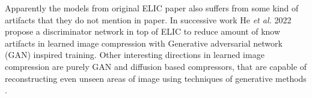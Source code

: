 \documentclass{article}
\begin{document}
Apparently the models from original ELIC paper also suffers from some kind of artifacts that they do not mention in paper. In successive work He \textit{et al.} 2022 \cite{PO-ELIC} propose a discriminator network in top of ELIC to reduce amount of know artifacts in learned image compression with Generative adversarial network (GAN) inspired training. Other interesting directions in learned image compression are purely GAN and diffusion based compressors, that are capable of reconstructing even unseen areas of image using techniques of generative methods \cite{HIFIC, diffusion}. 





\end{document}

